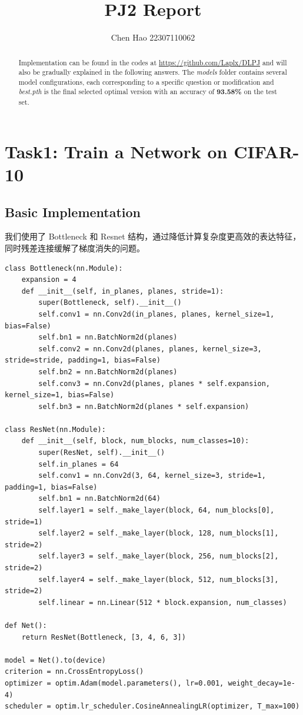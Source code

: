 \documentclass[10pt]{ctexart}
\title{PJ2 Report}
\author{Chen Hao 22307110062}
\begin{document}
\maketitle

\begin{abstract}
Implementation can be found in the codes at \url{https://github.com/Laplx/DLPJ} and will also be gradually explained in the following answers. The \textit{models} folder contains several model configurations, each corresponding to a specific question or modification and \textit{best.pth} is the final selected optimal version with an accuracy of \textbf{93.58\%} on the test set. 
\end{abstract}

\section{Task1: Train a Network on CIFAR-10}
\subsection{Basic Implementation}
我们使用了 Bottleneck 和 Resnet 结构，通过降低计算复杂度更高效的表达特征，同时残差连接缓解了梯度消失的问题。
\begin{lstlisting}
class Bottleneck(nn.Module):
	expansion = 4
	def __init__(self, in_planes, planes, stride=1):
		super(Bottleneck, self).__init__()
		self.conv1 = nn.Conv2d(in_planes, planes, kernel_size=1, bias=False)
		self.bn1 = nn.BatchNorm2d(planes)
		self.conv2 = nn.Conv2d(planes, planes, kernel_size=3, stride=stride, padding=1, bias=False)
		self.bn2 = nn.BatchNorm2d(planes)
		self.conv3 = nn.Conv2d(planes, planes * self.expansion, kernel_size=1, bias=False)
		self.bn3 = nn.BatchNorm2d(planes * self.expansion)
	
class ResNet(nn.Module):
	def __init__(self, block, num_blocks, num_classes=10):
		super(ResNet, self).__init__()
		self.in_planes = 64
		self.conv1 = nn.Conv2d(3, 64, kernel_size=3, stride=1, padding=1, bias=False)
		self.bn1 = nn.BatchNorm2d(64)
		self.layer1 = self._make_layer(block, 64, num_blocks[0], stride=1)
		self.layer2 = self._make_layer(block, 128, num_blocks[1], stride=2)
		self.layer3 = self._make_layer(block, 256, num_blocks[2], stride=2)
		self.layer4 = self._make_layer(block, 512, num_blocks[3], stride=2)
		self.linear = nn.Linear(512 * block.expansion, num_classes)
	
def Net():
	return ResNet(Bottleneck, [3, 4, 6, 3])
	
model = Net().to(device)
criterion = nn.CrossEntropyLoss()
optimizer = optim.Adam(model.parameters(), lr=0.001, weight_decay=1e-4)
scheduler = optim.lr_scheduler.CosineAnnealingLR(optimizer, T_max=100)
\end{lstlisting}
\end{document}
